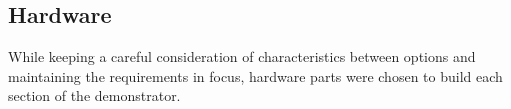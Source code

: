 \subsection{Hardware} \label{sec:proposed-hardware}

While keeping a careful consideration of characteristics between options and maintaining the requirements in focus, hardware parts were chosen to build each section of the demonstrator.

